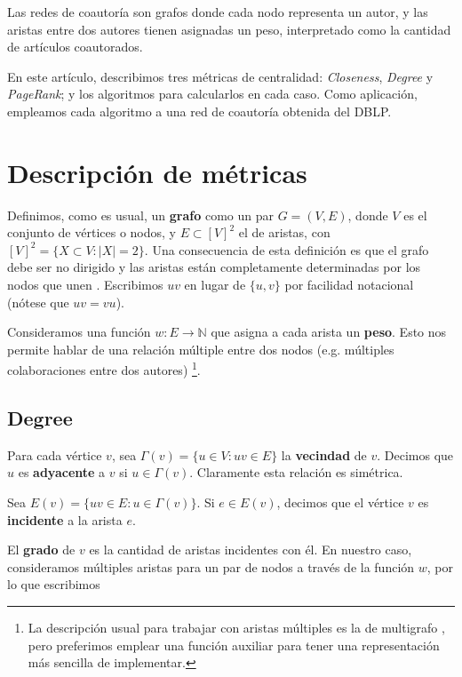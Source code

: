 \documentclass[journal]{IEEEtran}
\begin{document}
Las redes de coautoría son grafos donde cada nodo representa un autor, y las aristas entre dos autores tienen asignadas un peso, interpretado como la cantidad de artículos coautorados.

En este artículo, describimos tres métricas de centralidad: \textit{Closeness}, \textit{Degree} y \textit{PageRank}; y los algoritmos para calcularlos en cada caso. Como aplicación, empleamos cada algoritmo a una red de coautoría obtenida del DBLP.

\section{Descripción de métricas}

Definimos, como es usual, un \textbf{grafo} como un par \(G = (V, E)\), donde \(V\) es el conjunto de vértices o nodos, y \(E \subset [V]^2 \) el de aristas, con \([V]^2 = \{ X \subset V : |X| = 2 \}\). Una consecuencia de esta definición es que el grafo debe ser no dirigido y las aristas están completamente determinadas por los nodos que unen \cite{diestel}. Escribimos \(uv\) en lugar de \(\{u, v\}\) por facilidad notacional (nótese que \(uv = vu\)).

Consideramos una función \(w: E \rightarrow \mathbb{N} \) que asigna a cada arista un \textbf{peso}. Esto nos permite hablar de una relación múltiple entre dos nodos (e.g. múltiples colaboraciones entre dos autores) \footnote{La descripción usual para trabajar con aristas múltiples es la de multigrafo \cite{diestel}, pero preferimos emplear una función auxiliar para tener una representación más sencilla de implementar. }. 

\subsection{Degree}

Para cada vértice \(v\), sea \(\Gamma(v) = \{u \in V : uv \in E \}\) la \textbf{vecindad} de \(v\). Decimos que \(u\) es \textbf{adyacente} a \(v\) si \(u \in \Gamma(v)\). Claramente esta relación es simétrica.

Sea \(E(v) = \{uv \in E : u \in \Gamma(v) \}\). Si \(e \in E(v)\), decimos que el vértice \(v\) es \textbf{incidente} a la arista \(e\).

El \textbf{grado} de \(v\) es la cantidad de aristas incidentes con él. En nuestro caso, consideramos múltiples aristas para un par de nodos a través de la función \(w\), por lo que escribimos \cite{bollobas}
\end{document}
